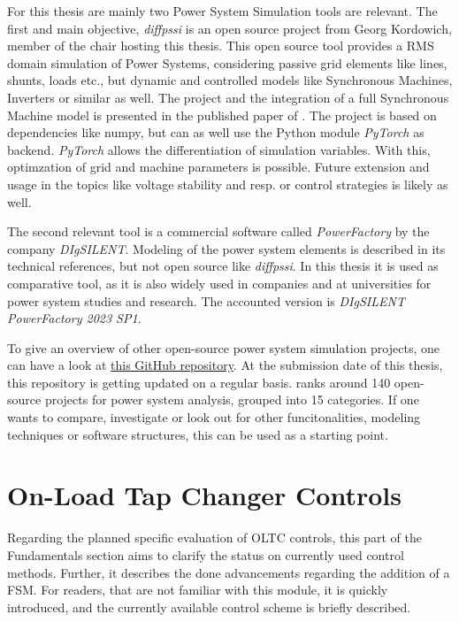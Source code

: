 For this thesis are mainly two Power System Simulation tools are relevant.
The first and main objective, \textit{diffpssi} is an open source project from Georg Kordowich, member of the chair hosting this thesis.
This open source tool provides a \acs{RMS} domain simulation of Power Systems, considering passive grid elements like lines, shunts, loads etc., but dynamic and controlled models like Synchronous Machines, Inverters or similar as well.
The project and the integration of a full Synchronous Machine model is presented in the published paper of \textcite{kordowich_2023}.
The project is based on dependencies like numpy, but can as well use the Python module \textit{PyTorch} as backend.
\textit{PyTorch} allows the differentiation of simulation variables.
With this, optimzation of grid and machine parameters is possible.
Future extension and usage in the topics like voltage stability and resp. or control strategies is likely as well.

The second relevant tool is a commercial software called \textit{PowerFactory} by the company \textit{DIgSILENT}.
Modeling of the power system elements is described in its technical references, but not open source like \textit{diffpssi}.
In this thesis it is used as comparative tool, as it is also widely used in companies and at universities for power system studies and research.
The accounted version is \textit{DIgSILENT PowerFactory 2023 SP1}.

To give an overview of other open-source power system simulation projects, one can have a look at \href{https://github.com/ps-wiki/best-of-ps}{this GitHub repository}.
At the submission date of this thesis, this repository is getting updated on a regular basis.
\textcite{jinningwang_2025} ranks around 140 open-source projects for power system analysis, grouped into 15 categories.
If one wants to compare, investigate or look out for other funcitonalities, modeling techniques or software structures, this can be used as a starting point.
        
\section{On-Load Tap Changer Controls}

Regarding the planned specific evaluation of \acs{OLTC} controls, this part of the Fundamentals section aims to clarify the status on currently used control methods.
Further, it describes the done advancements regarding the addition of a \acf{FSM}.
For readers, that are not familiar with this module, it is quickly introduced, and the currently available control scheme is briefly described.

